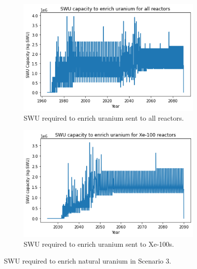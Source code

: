\documentclass[preprint]{elsarticle}
\providecommand{\DIFaddbeginFL}{} %
\providecommand{\DIFaddendFL}{} %
\providecommand{\DIFdelbeginFL}{} %
\providecommand{\DIFdelendFL}{} %
\begin{document}
\begin{figure}
    \centering
    \begin{subfigure}{0.5\textwidth}
        \centering
        \DIFdelbeginFL %
\DIFdelendFL \DIFaddbeginFL \includegraphics[scale=0.5]{../figures/totalswu_scenarios_3.png}
        \DIFaddendFL \caption{\gls{SWU} required to enrich uranium sent to all reactors.}
        \label{fig:totalswu_3}
    \end{subfigure}
    \hspace{0.8cm}
    \begin{subfigure}{0.5\textwidth}
        \centering
        \DIFdelbeginFL %
\DIFdelendFL \DIFaddbeginFL \includegraphics[scale=0.5]{../figures/haleuSWU_scenarios_3.png}
        \DIFaddendFL \caption{\gls{SWU} required to enrich uranium sent to Xe-100s.}
        \label{fig:haleuswu_3}
    \end{subfigure}
    \caption{\gls{SWU} required to enrich natural uranium in Scenario 3.}
    \label{fig:swu_3}
\end{figure}
\end{document}
